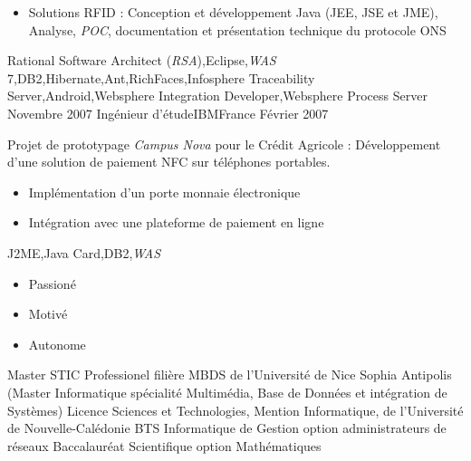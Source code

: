 \documentclass[localFont,alternative,10pt,compact]{yaac-another-awesome-cv}
\begin{document}
\begin{experiences}
{\begin{itemize}
	                        \item Solutions RFID : Conception et développement Java (JEE, JSE et JME), Analyse, \emph{POC}, documentation et présentation technique du protocole ONS
	                      \end{itemize}
	                    }
	                    {Rational Software Architect (\emph{RSA}),Eclipse,\emph{WAS} 7,DB2,Hibernate,Ant,RichFaces,Infosphere Traceability Server,Android,Websphere Integration Developer,Websphere Process Server}
	  \emptySeparator         
	  \experience
	  {Novembre 2007}  {Ingénieur d'étude}{IBM}{France}
	  {Février 2007}   {
	                      Projet de prototypage \emph{Campus Nova} pour le Crédit Agricole : Développement d'une solution de paiement NFC sur téléphones portables.  
	                      \begin{itemize}
	                        \item Implémentation d'un porte monnaie électronique                                            
	                        \item Intégration avec une plateforme de paiement en ligne  
	                      \end{itemize}
	                  }
	                  {J2ME,Java Card,DB2,\emph{WAS}}  
	\end{experiences}

	\twocolumnsection
	{
	\begin{skills}
	\end{skills}}
	{
	\vspace{1em}
	\begin{itemize}
		\item Passioné
		\item Motivé                    
	    \item Autonome
	\end{itemize}
	}
	\begin{scholarship}
						{Master STIC Professionel filière MBDS de l'Université de Nice Sophia Antipolis (Master Informatique spécialité Multimédia, Base de Données et intégration de Systèmes)}
						{Licence Sciences et Technologies, Mention Informatique, de l'Université de Nouvelle-Calédonie}
						{BTS Informatique de Gestion option administrateurs de réseaux}
						{Baccalauréat Scientifique option Mathématiques}
	\end{scholarship}
\end{document}
